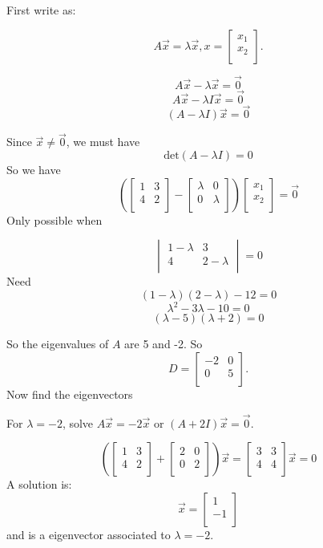 \documentclass[a4paper,10pt]{article}
\theoremstyle{definition}
\begin{document}
First write as:

$$A\vec{x} = \lambda \vec{x}, x = 
\begin{bmatrix}
	x_1 \\
	x_2 \\
\end{bmatrix}
.
$$

$$A\vec{x} - \lambda \vec{x} = \vec{0}$$
$$A\vec{x} - \lambda I\vec{x} = \vec{0}$$
$$(A - \lambda I)\vec{x} = \vec{0}$$

Since $\vec{x} \neq \vec{0}$, we must have
$$\text{det}(A - \lambda I) = 0$$
So we have
$$
\left(
\begin{bmatrix}
	1 & 3 \\
	4 & 2 \\
\end{bmatrix}
-
\begin{bmatrix}
	\lambda & 0 \\
	0 & \lambda \\
\end{bmatrix}
\right)
\begin{bmatrix}
	x_1 \\
	x_2 \\
\end{bmatrix}
=
\vec{0}
$$
Only possible when

$$
\begin{vmatrix}
	1-\lambda & 3 \\
	4 & 2-\lambda \\
\end{vmatrix}
=0
$$
Need
$$(1-\lambda)(2-\lambda) - 12 = 0$$
$$\lambda^2-3\lambda - 10 = 0$$
$$(\lambda -5)(\lambda +2) = 0$$

So the eigenvalues of $A$ are 5 and -2. So
$$D = 
\begin{bmatrix}
	-2 & 0 \\
	0 & 5 \\
\end{bmatrix}
.
$$
Now find the eigenvectors

For $\lambda = -2$, solve $A\vec{x} = -2\vec{x}$ or $(A + 2I)\vec{x} = \vec{0}$.

$$
\left(
\begin{bmatrix}
	1 & 3 \\
	4 & 2 \\
\end{bmatrix}
+
\begin{bmatrix}
	2 & 0 \\
	0 & 2 \\
\end{bmatrix}
\right)
\vec{x}
=
\begin{bmatrix}
	3 & 3 \\
	4 & 4 \\
\end{bmatrix}
\vec{x}
=
0
$$
A solution is:
$$\vec{x} = 
\begin{bmatrix}
	1 \\
	-1 \\
\end{bmatrix}
$$
and is a eigenvector associated to $\lambda = -2$.
\end{document}
